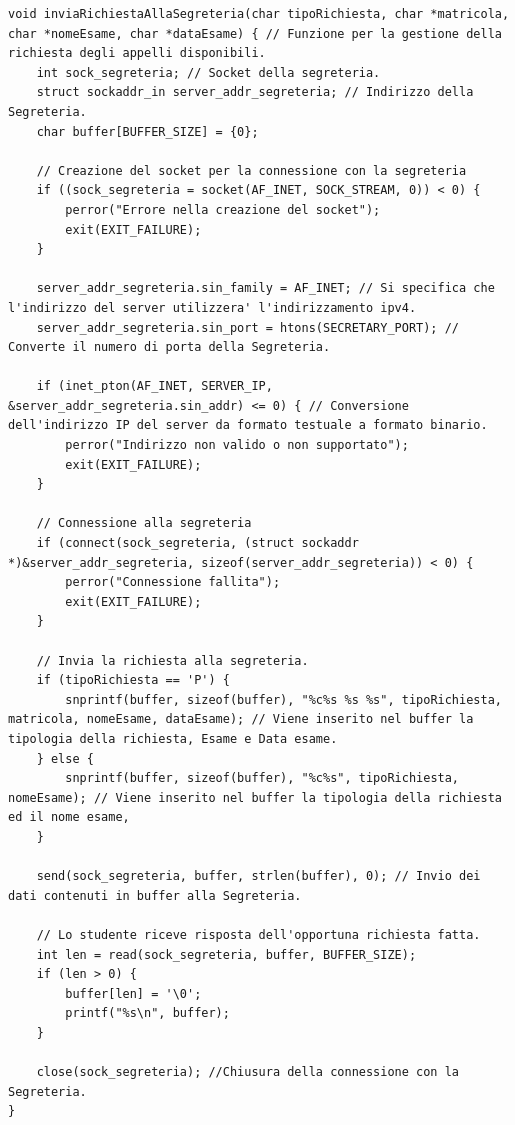 \documentclass[12pt]{article}
\begin{document}
\begin{lstlisting}[style=CStyle]
void inviaRichiestaAllaSegreteria(char tipoRichiesta, char *matricola, char *nomeEsame, char *dataEsame) { // Funzione per la gestione della richiesta degli appelli disponibili.
    int sock_segreteria; // Socket della segreteria.
    struct sockaddr_in server_addr_segreteria; // Indirizzo della Segreteria.
    char buffer[BUFFER_SIZE] = {0}; 

    // Creazione del socket per la connessione con la segreteria
    if ((sock_segreteria = socket(AF_INET, SOCK_STREAM, 0)) < 0) {
        perror("Errore nella creazione del socket");
        exit(EXIT_FAILURE);
    }

    server_addr_segreteria.sin_family = AF_INET; // Si specifica che l'indirizzo del server utilizzera' l'indirizzamento ipv4.
    server_addr_segreteria.sin_port = htons(SECRETARY_PORT); // Converte il numero di porta della Segreteria.

    if (inet_pton(AF_INET, SERVER_IP, &server_addr_segreteria.sin_addr) <= 0) { // Conversione dell'indirizzo IP del server da formato testuale a formato binario.
        perror("Indirizzo non valido o non supportato");
        exit(EXIT_FAILURE);
    }

    // Connessione alla segreteria
    if (connect(sock_segreteria, (struct sockaddr *)&server_addr_segreteria, sizeof(server_addr_segreteria)) < 0) {
        perror("Connessione fallita");
        exit(EXIT_FAILURE);
    }

    // Invia la richiesta alla segreteria.
    if (tipoRichiesta == 'P') {
        snprintf(buffer, sizeof(buffer), "%c%s %s %s", tipoRichiesta, matricola, nomeEsame, dataEsame); // Viene inserito nel buffer la tipologia della richiesta, Esame e Data esame. 
    } else {
        snprintf(buffer, sizeof(buffer), "%c%s", tipoRichiesta, nomeEsame); // Viene inserito nel buffer la tipologia della richiesta ed il nome esame,
    }

    send(sock_segreteria, buffer, strlen(buffer), 0); // Invio dei dati contenuti in buffer alla Segreteria.

    // Lo studente riceve risposta dell'opportuna richiesta fatta.
    int len = read(sock_segreteria, buffer, BUFFER_SIZE);
    if (len > 0) {
        buffer[len] = '\0';
        printf("%s\n", buffer);
    }

    close(sock_segreteria); //Chiusura della connessione con la Segreteria.
}
\end{lstlisting}
\end{document}
